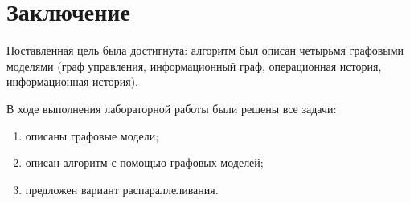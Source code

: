 \chapter*{Заключение}

Поставленная цель была достигнута: алгоритм был описан четырьмя графовыми моделями (граф управления, информационный граф, операционная история, информационная история).

В ходе выполнения лабораторной работы были решены все задачи:
\begin{enumerate}
	\item описаны графовые модели;
	\item описан алгоритм с помощью графовых моделей;
	\item предложен вариант распараллеливания.
\end{enumerate}

